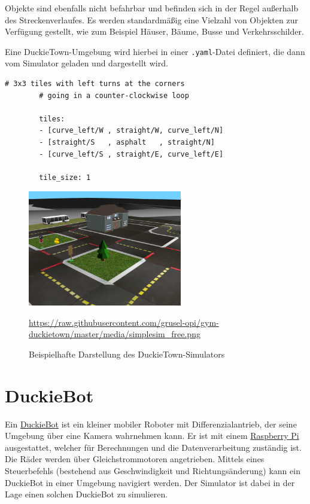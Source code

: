 Objekte sind ebenfalls nicht befahrbar und befinden sich in der Regel außerhalb des Streckenverlaufes. Es werden standardmäßig eine Vielzahl von Objekten zur Verfügung gestellt, wie zum Beispiel Häuser, Bäume, Busse und Verkehrsschilder.

Eine DuckieTown-Umgebung wird hierbei in einer \texttt{.yaml}-Datei definiert, die dann vom Simulator geladen und dargestellt wird.

\hspace{1cm}
\begin{minipage}{.73\linewidth}
	\begin{lstlisting}[caption={Beispieldefinition einer DuckieTown-Umgebung}]
		# 3x3 tiles with left turns at the corners
		# going in a counter-clockwise loop
	
		tiles:
		- [curve_left/W , straight/W, curve_left/N]
		- [straight/S   , asphalt   , straight/N]
		- [curve_left/S , straight/E, curve_left/E]
	
		tile_size: 1
	\end{lstlisting}
\end{minipage}


\begin{figure}[H]
	\centering
	\includegraphics[width=0.6\textwidth]{kapitel2/images/duckietown-gym.png}
	\label{fig:duckietown-gym}
	\caption{Beispielhafte Darstellung des DuckieTown-Simulators}
	\vspace{0.2cm}
	\quelle\url{https://raw.githubusercontent.com/grusel-opi/gym-duckietown/master/media/simplesim_free.png}
\end{figure}

\section{DuckieBot}
\label{duckiebot}

Ein \href{https://get.duckietown.com/products/duckiebot-db18}{DuckieBot} ist ein kleiner mobiler Roboter mit Differenzialantrieb, der seine Umgebung über eine Kamera wahrnehmen kann. Er ist mit einem \href{https://www.raspberrypi.org/}{Raspberry Pi} ausgestattet, welcher für Berechnungen und die Datenverarbeitung zuständig ist. Die  Räder werden über Gleichstrommotoren angetrieben. Mittels eines Steuerbefehls (bestehend aus Geschwindigkeit und Richtungsänderung) kann ein DuckieBot in einer Umgebung navigiert werden. \cite{duckietown_platform}
Der Simulator ist dabei in der Lage einen solchen DuckieBot zu simulieren.

